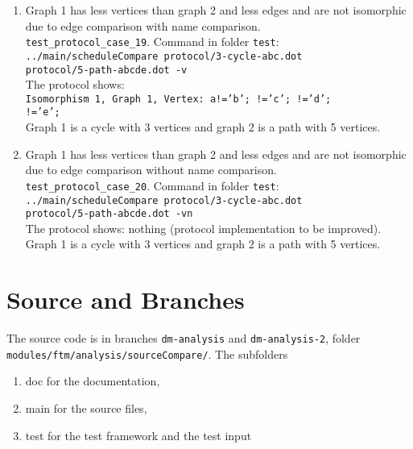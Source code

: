 \documentclass[12pt,a4paper]{report}
\begin{document}
\begin{enumerate}
{    compare: -1, key: par, value1: '', value2: '1'.} \\
    Vertices in graph 2 have a parameter value 1. Vertices in graph 1 have no parameter.
  \item Graph 1 has less vertices than graph 2 and less edges and are not isomorphic due to edge comparison with name comparison. \\
    \texttt{test\_protocol\_case\_19}. Command in folder \texttt{test}: \\
    \texttt{../main/scheduleCompare protocol/3-cycle-abc.dot \\ protocol/5-path-abcde.dot -v} \\
    The protocol shows: \\
    \texttt{Isomorphism 1, Graph 1, Vertex: a!='b'; !='c'; !='d'; \\ !='e';} \\
    Graph 1 is a cycle with 3 vertices and graph 2 is a path with 5 vertices.
  \item Graph 1 has less vertices than graph 2 and less edges and are not isomorphic due to edge comparison without name comparison. \\
    \texttt{test\_protocol\_case\_20}. Command in folder \texttt{test}: \\
    \texttt{../main/scheduleCompare protocol/3-cycle-abc.dot \\ protocol/5-path-abcde.dot -vn} \\
    The protocol shows: nothing (protocol implementation to be improved). \\
    Graph 1 is a cycle with 3 vertices and graph 2 is a path with 5 vertices.
\end{enumerate}

\chapter{Source and Branches}
The source code is in branches \texttt{dm-analysis} and \texttt{dm-analysis-2},
folder \texttt{modules/ftm/analysis/sourceCompare/}. The subfolders
\begin{enumerate}
  \item doc for the documentation,
  \item main for the source files,
  \item test for the test framework and the test input
\end{enumerate}
\end{document}
